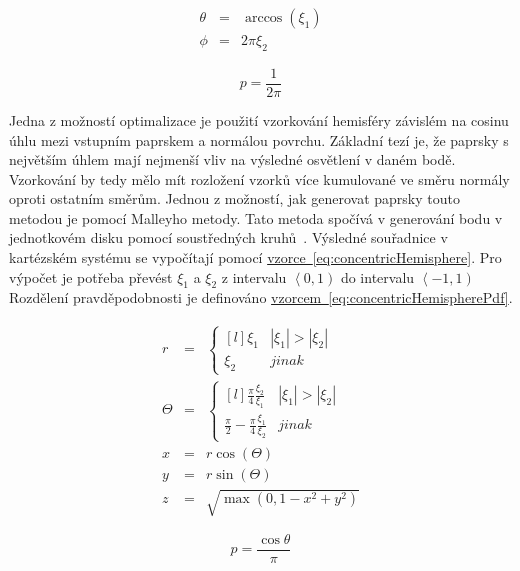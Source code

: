 \documentclass[czech,master]{diploma}
\newcommand{\intervalco}[2]{\left<{{#1},{#2}}\right)}
\newcommand{\randU}{\xi_{1}}
\newcommand{\randV}{\xi_{2}}
\begin{document}
\begin{eqnarray}
  \theta & = & \arccos(\randU) \nonumber \\
  \phi & = & 2\pi\randV \label{eq:hemisphereSampling}
\end{eqnarray}

\begin{equation} \label{eq:hemisphereSamplingPdf}
  p = \frac{1}{2\pi}
\end{equation}

Jedna z možností optimalizace je použití vzorkování hemisféry závislém na cosinu úhlu mezi vstupním paprskem a normálou povrchu. Základní tezí je, že paprsky s největším úhlem mají nejmenší vliv na výsledné osvětlení v daném bodě. Vzorkování by tedy mělo mít rozložení vzorků více kumulované ve směru normály oproti ostatním směrům. Jednou z možností, jak generovat paprsky touto metodou je pomocí Malleyho metody. Tato metoda spočívá v generování bodu v jednotkovém disku pomocí soustředných kruhů~\cite{PHARR2017747}. Výsledné souřadnice v kartézském systému se vypočítají pomocí \hyperref[eq:concentricHemisphere]{vzorce~\ref{eq:concentricHemisphere}}. Pro výpočet je potřeba převést \(\randU\) a \(\randV\) z intervalu \(\intervalco{0}{1}\) do intervalu \(\intervalco{-1}{1}\)  Rozdělení pravděpodobnosti je definováno \hyperref[eq:concentricHemisphere]{vzorcem~\ref{eq:concentricHemispherePdf}}.

\begin{eqnarray}
  r & = & \left\{\begin{matrix*}[l] \randU & |\randU| > \left | \randV \right |\\ \randV & jinak \end{matrix*}\right. \nonumber \\
  \Theta & = & \left\{\begin{matrix*}[l] \frac{\pi}{4}\frac{\randV}{\randU} & |\randU| > \left | \randV \right |\\ \frac{\pi}{2}-\frac{\pi}{4}\frac{\randU}{\randV} & jinak \end{matrix*}\right. \nonumber \\
  x & = &r\cos(\Theta)\nonumber \\
  y & = &r\sin(\Theta)\nonumber \\
  z & = &\sqrt{ \max(0, 1 - x^2 + y^2) }\label{eq:concentricHemisphere}
\end{eqnarray}

\begin{equation} \label{eq:concentricHemispherePdf}
  p = \frac{\cos\theta}{\pi}
\end{equation}
\end{document}
